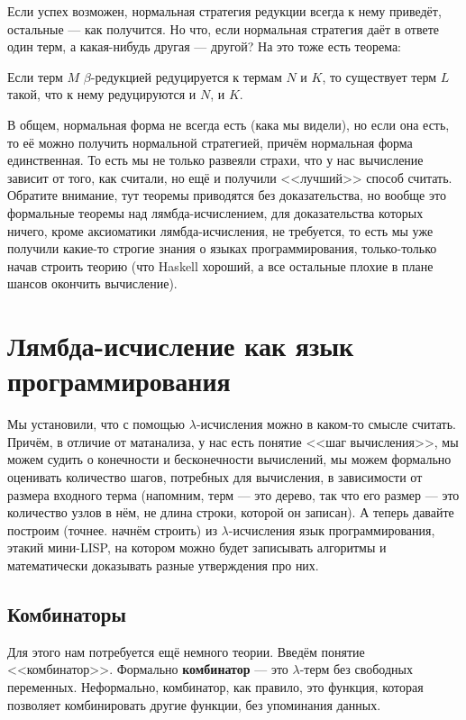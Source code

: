 \documentclass{../../text-style}
\begin{document}
Если успех возможен, нормальная стратегия редукции всегда к нему приведёт, остальные --- как получится. Но что, если нормальная стратегия даёт в ответе один терм, а какая-нибудь другая --- другой? На это тоже есть теорема: 

\begin{rustheorem}
    Если терм $M$ $\beta$-редукцией редуцируется к термам $N$ и $K$, то существует терм $L$ такой, что к нему редуцируются и $N$, и $K$.
\end{rustheorem}

В общем, нормальная форма не всегда есть (кака мы видели), но если она есть, то её можно получить нормальной стратегией, причём нормальная форма единственная. То есть мы не только развеяли страхи, что у нас вычисление зависит от того, как считали, но ещё и получили <<лучший>> способ считать. Обратите внимание, тут теоремы приводятся без доказательства, но вообще это формальные теоремы над лямбда-исчислением, для доказательства которых ничего, кроме аксиоматики лямбда-исчисления, не требуется, то есть мы уже получили какие-то строгие знания о языках программирования, только-только начав строить теорию (что Haskell хороший, а все остальные плохие в плане шансов окончить вычисление).

\section{Лямбда-исчисление как язык программирования}

Мы установили, что с помощью $\lambda$-исчисления можно в каком-то смысле считать. Причём, в отличие от матанализа, у нас есть понятие <<шаг вычисления>>, мы можем судить о конечности и бесконечности вычислений, мы можем формально оценивать количество шагов, потребных для вычисления, в зависимости от размера входного терма (напомним, терм --- это дерево, так что его размер --- это количество узлов в нём, не длина строки, которой он записан). А теперь давайте построим (точнее. начнём строить) из $\lambda$-исчисления язык программирования, этакий мини-LISP, на котором можно будет записывать алгоритмы и математически доказывать разные утверждения про них.

\subsection{Комбинаторы}

Для этого нам потребуется ещё немного теории. Введём понятие <<комбинатор>>. Формально \textbf{комбинатор} --- это $\lambda$-терм без свободных переменных. Неформально, комбинатор, как правило, это функция, которая позволяет комбинировать другие функции, без упоминания данных.
\end{document}
